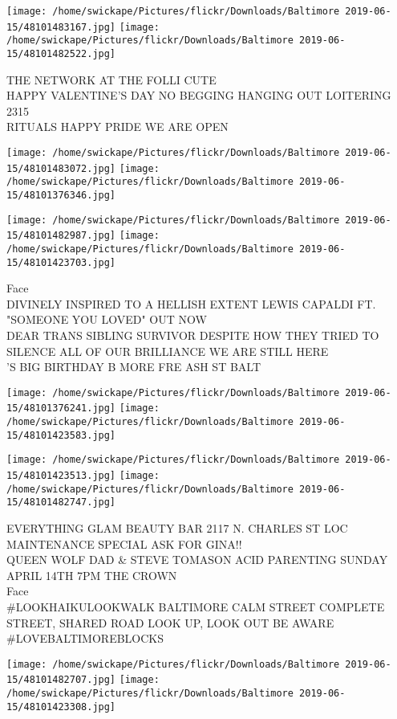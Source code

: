 \documentclass[10pt,letterpaper]{article}
\begin{document}
\texttt{[image: /home/swickape/Pictures/flickr/Downloads/Baltimore 2019-06-15/48101483167.jpg]}
\texttt{[image: /home/swickape/Pictures/flickr/Downloads/Baltimore 2019-06-15/48101482522.jpg]}

THE NETWORK AT THE FOLLI CUTE\\
HAPPY VALENTINE'S DAY NO BEGGING HANGING OUT LOITERING\\
2315\\
RITUALS HAPPY PRIDE WE ARE OPEN
\pagebreak

\texttt{[image: /home/swickape/Pictures/flickr/Downloads/Baltimore 2019-06-15/48101483072.jpg]}
\texttt{[image: /home/swickape/Pictures/flickr/Downloads/Baltimore 2019-06-15/48101376346.jpg]}

\texttt{[image: /home/swickape/Pictures/flickr/Downloads/Baltimore 2019-06-15/48101482987.jpg]}
\texttt{[image: /home/swickape/Pictures/flickr/Downloads/Baltimore 2019-06-15/48101423703.jpg]}

Face\\
DIVINELY INSPIRED TO A HELLISH EXTENT LEWIS CAPALDI FT. "SOMEONE YOU LOVED" OUT NOW\\
DEAR TRANS SIBLING SURVIVOR DESPITE HOW THEY TRIED TO SILENCE ALL OF OUR BRILLIANCE WE ARE STILL HERE\\
'S BIG BIRTHDAY B MORE FRE ASH ST BALT
\pagebreak

\texttt{[image: /home/swickape/Pictures/flickr/Downloads/Baltimore 2019-06-15/48101376241.jpg]}
\texttt{[image: /home/swickape/Pictures/flickr/Downloads/Baltimore 2019-06-15/48101423583.jpg]}

\texttt{[image: /home/swickape/Pictures/flickr/Downloads/Baltimore 2019-06-15/48101423513.jpg]}
\texttt{[image: /home/swickape/Pictures/flickr/Downloads/Baltimore 2019-06-15/48101482747.jpg]}

EVERYTHING GLAM BEAUTY BAR 2117 N. CHARLES ST LOC MAINTENANCE SPECIAL ASK FOR GINA!!\\
QUEEN WOLF DAD \& STEVE TOMASON ACID PARENTING SUNDAY APRIL 14TH 7PM THE CROWN\\
Face\\
\#LOOKHAIKULOOKWALK BALTIMORE CALM STREET COMPLETE STREET, SHARED ROAD LOOK UP, LOOK OUT BE AWARE \#LOVEBALTIMOREBLOCKS
\pagebreak

\texttt{[image: /home/swickape/Pictures/flickr/Downloads/Baltimore 2019-06-15/48101482707.jpg]}
\texttt{[image: /home/swickape/Pictures/flickr/Downloads/Baltimore 2019-06-15/48101423308.jpg]}
\end{document}

